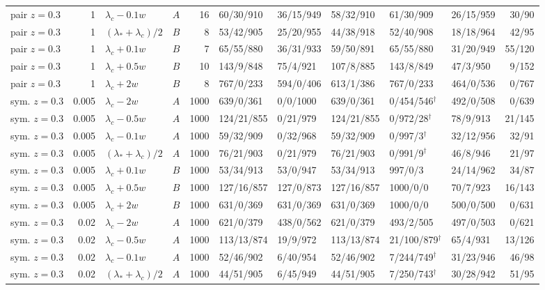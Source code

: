 \begin{longtable}{@{}lrllrlllllr@{}}
pair $z{=}0.3$ & 1 & $\lambda_c-0.1w$ & $A$ & 16 & 60/30/910 & 36/15/949 & 58/32/910 & 61/30/909 & 26/15/959 & 30/90\\
pair $z{=}0.3$ & 1 & $(\lambda_*+\lambda_c)/2$ & $B$ & 8 & 53/42/905 & 25/20/955 & 44/38/918 & 52/40/908 & 18/18/964 & 42/95\\
pair $z{=}0.3$ & 1 & $\lambda_c+0.1w$ & $B$ & 7 & 65/55/880 & 36/31/933 & 59/50/891 & 65/55/880 & 31/20/949 & 55/120\\
pair $z{=}0.3$ & 1 & $\lambda_c+0.5w$ & $B$ & 10 & 143/9/848 & 75/4/921 & 107/8/885 & 143/8/849 & 47/3/950 & 9/152\\
pair $z{=}0.3$ & 1 & $\lambda_c+2w$ & $B$ & 8 & 767/0/233 & 594/0/406 & 613/1/386 & 767/0/233 & 464/0/536 & 0/767\\
sym. $z{=}0.3$ & 0.005 & $\lambda_c-2w$ & $A$ & 1000 & 639/0/361 & 0/0/1000 & 639/0/361 & 0/454/546$^\dagger$ & 492/0/508 & 0/639\\
sym. $z{=}0.3$ & 0.005 & $\lambda_c-0.5w$ & $A$ & 1000 & 124/21/855 & 0/21/979 & 124/21/855 & 0/972/28$^\dagger$ & 78/9/913 & 21/145\\
sym. $z{=}0.3$ & 0.005 & $\lambda_c-0.1w$ & $A$ & 1000 & 59/32/909 & 0/32/968 & 59/32/909 & 0/997/3$^\dagger$ & 32/12/956 & 32/91\\
sym. $z{=}0.3$ & 0.005 & $(\lambda_*+\lambda_c)/2$ & $A$ & 1000 & 76/21/903 & 0/21/979 & 76/21/903 & 0/991/9$^\dagger$ & 46/8/946 & 21/97\\
sym. $z{=}0.3$ & 0.005 & $\lambda_c+0.1w$ & $B$ & 1000 & 53/34/913 & 53/0/947 & 53/34/913 & 997/0/3 & 24/14/962 & 34/87\\
sym. $z{=}0.3$ & 0.005 & $\lambda_c+0.5w$ & $B$ & 1000 & 127/16/857 & 127/0/873 & 127/16/857 & 1000/0/0 & 70/7/923 & 16/143\\
sym. $z{=}0.3$ & 0.005 & $\lambda_c+2w$ & $B$ & 1000 & 631/0/369 & 631/0/369 & 631/0/369 & 1000/0/0 & 500/0/500 & 0/631\\
sym. $z{=}0.3$ & 0.02 & $\lambda_c-2w$ & $A$ & 1000 & 621/0/379 & 438/0/562 & 621/0/379 & 493/2/505 & 497/0/503 & 0/621\\
sym. $z{=}0.3$ & 0.02 & $\lambda_c-0.5w$ & $A$ & 1000 & 113/13/874 & 19/9/972 & 113/13/874 & 21/100/879$^\dagger$ & 65/4/931 & 13/126\\
sym. $z{=}0.3$ & 0.02 & $\lambda_c-0.1w$ & $A$ & 1000 & 52/46/902 & 6/40/954 & 52/46/902 & 7/244/749$^\dagger$ & 31/23/946 & 46/98\\
sym. $z{=}0.3$ & 0.02 & $(\lambda_*+\lambda_c)/2$ & $A$ & 1000 & 44/51/905 & 6/45/949 & 44/51/905 & 7/250/743$^\dagger$ & 30/28/942 & 51/95\\

\end{longtable}
